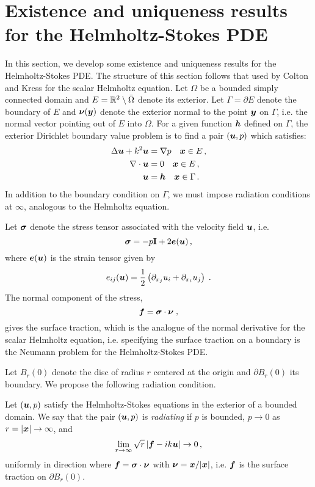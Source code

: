 \section{Existence and uniqueness results for the Helmholtz-Stokes PDE}

In this section, we develop some existence and uniqueness
results for the Helmholtz-Stokes PDE.
%
The structure of this section follows that used
by Colton and Kress \cite[Ch. 3]{colton1983integral}
for the scalar Helmholtz equation.
%
Let $\Omega$ be a bounded simply connected
domain and $E = \mathbb{R}^{2} \setminus \bar{\Omega}$ denote its
exterior.
%
Let $\Gamma = \partial E$ denote the boundary of $E$ and
${\boldsymbol \nu}({\boldsymbol y})$ denote the exterior normal to the point ${\boldsymbol y}$ on
$\Gamma$, i.e. the normal vector pointing out of $E$ into $\Omega$.
%
For a given function ${\boldsymbol h}$ defined on $\Gamma$,
the exterior Dirichlet boundary value problem is to
find a pair $({\boldsymbol u},p)$ which satisfies:
\begin{align}
\Delta {\boldsymbol u} + k^{2} {\boldsymbol u} &= \nabla p \quad {\boldsymbol x} \in E \, ,\label{eq:helmstokes_ext}\\
\nabla \cdot {\boldsymbol u} &= 0 \quad {\boldsymbol x} \in E \, , \\
{\boldsymbol u} &= {\boldsymbol h} \quad {\boldsymbol x} \in \Gamma \, .
\end{align}
In addition to the boundary condition on
$\Gamma$, we must impose radiation conditions
at $\infty$, analogous to the Helmholtz equation.
%

Let ${\boldsymbol \sigma}$ denote the stress tensor associated with the velocity
field ${\boldsymbol u}$, i.e.
\begin{equation}
{\boldsymbol \sigma} = -p {\bf I} + 2 {\boldsymbol e}({\boldsymbol u}) \, ,
\end{equation}
where ${\boldsymbol e}({\boldsymbol u})$ is the strain tensor given by
\begin{equation}
e_{ij}({\boldsymbol u}) = \frac{1}{2} \left( \partial_{x_j} u_i + \partial_{x_i} u_j \right) \; .
\end{equation}
%
The normal component of the stress,
\begin{equation}
{\boldsymbol f} = {\boldsymbol \sigma} \cdot {\boldsymbol \nu} \; ,
\end{equation}
gives the surface traction, which is the analogue of
the normal derivative for the scalar Helmholtz equation,
i.e. specifying the surface traction on a boundary is
the Neumann problem for the Helmholtz-Stokes PDE.

%
Let $B_r(0)$ denote the disc of radius $r$ centered
at the origin and $\partial B_r(0)$ its boundary.
%
We propose the following radiation condition.

\begin{definition} \label{def:radcond}
Let $({\boldsymbol u},p)$ satisfy the Helmholtz-Stokes equations in
the exterior of a bounded domain. We say that
the pair $({\boldsymbol u},p)$ is {\em radiating} if
$p$ is bounded, $p \to 0$ as $r = |{\boldsymbol x}| \to \infty$, and 
\begin{equation}
\lim_{r\to \infty} \sqrt{r} \left| {\boldsymbol f} - i k {\boldsymbol u} \right| \to 0 \, ,
\label{eq:radcond}
\end{equation}
uniformly in direction where ${\boldsymbol f} = {\boldsymbol \sigma} \cdot {\boldsymbol \nu}$
with ${\boldsymbol \nu} = {\boldsymbol x}/|{\boldsymbol x}|$, i.e. ${\boldsymbol f}$ is the surface
traction on $\partial B_r(0)$.     
\end{definition}

